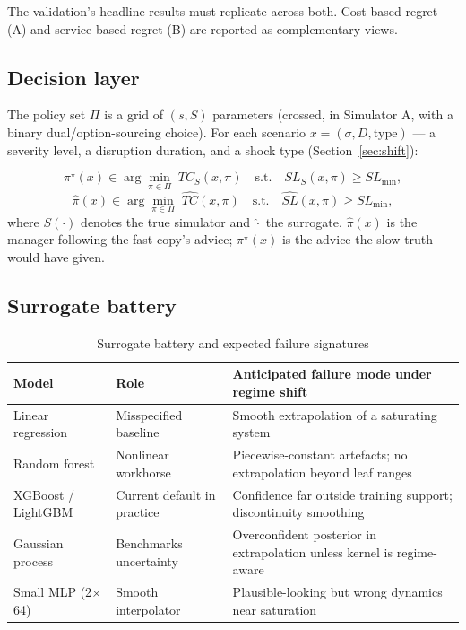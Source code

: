 \documentclass[12pt,a4paper]{article}
\begin{document}
The validation's headline results must replicate across both. Cost-based regret (A) and service-based regret (B) are reported as complementary views.

\subsection{Decision layer}

The policy set $\Pi$ is a grid of $(s,S)$ parameters (crossed, in Simulator A, with a binary dual/option-sourcing choice). For each scenario $x = (\sigma, D, \text{type})$ --- a severity level, a disruption duration, and a shock type (Section~\ref{sec:shift}):

\begin{equation}
\pi^{\star}(x) \in \arg\min_{\pi \in \Pi} \; TC_{S}(x,\pi) \quad \text{s.t.} \quad SL_{S}(x,\pi) \geq SL_{\min},
\end{equation}
\begin{equation}
\hat{\pi}(x) \in \arg\min_{\pi \in \Pi} \; \widehat{TC}(x,\pi) \quad \text{s.t.} \quad \widehat{SL}(x,\pi) \geq SL_{\min},
\end{equation}
where $S(\cdot)$ denotes the true simulator and $\widehat{\cdot}$ the surrogate. $\hat{\pi}(x)$ is the manager following the fast copy's advice; $\pi^{\star}(x)$ is the advice the slow truth would have given.

\subsection{Surrogate battery}\label{sec:battery}

\begin{table}[H]
\centering
\caption{Surrogate battery and expected failure signatures}
\label{tab:battery}
\footnotesize
\begin{tabular}{p{3.2cm}p{5.0cm}p{6.0cm}}
\toprule
\textbf{Model} & \textbf{Role} & \textbf{Anticipated failure mode under regime shift} \\
\midrule
Linear regression & Misspecified baseline & Smooth extrapolation of a saturating system \\
Random forest \citep{breiman2001} & Nonlinear workhorse & Piecewise-constant artefacts; no extrapolation beyond leaf ranges \\
XGBoost / LightGBM \citep{chen2016} & Current default in practice & Confidence far outside training support; discontinuity smoothing \\
Gaussian process \citep{rasmussen2006,sacks1989} & Benchmarks uncertainty & Overconfident posterior in extrapolation unless kernel is regime-aware \\
Small MLP (2$\times$64) & Smooth interpolator & Plausible-looking but wrong dynamics near saturation \\
\bottomrule
\end{tabular}
\end{table}
\end{document}
